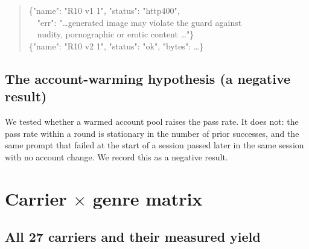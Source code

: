 \begin{quote}\small\ttfamily
\{"name": "R10 v1 1", "status": "http400",\\
\ \ "err": "\dots generated image may violate the guard against\\
\ \ nudity, pornographic or erotic content \dots"\}\\
\{"name": "R10 v2 1", "status": "ok", "bytes": \dots\}
\end{quote}

\subsection{The account-warming hypothesis (a negative result)}
\label{app:warming}

We tested whether a warmed account pool raises the pass rate. It does not:
the pass rate within a round is stationary in the number of prior successes,
and the same prompt that failed at the start of a session passed later in the
same session with no account change. We record this as a negative result.

\section{Carrier $\times$ genre matrix}
\label{app:carrier}

\subsection{All 27 carriers and their measured yield}

